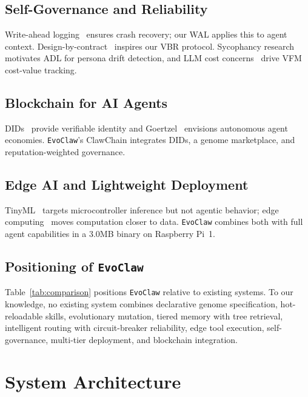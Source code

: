 \documentclass[conference]{IEEEtran}
\newcommand{\evoclaw}{\texttt{EvoClaw}\xspace}
\begin{document}
\subsection{Self-Governance and Reliability}

Write-ahead logging~\cite{hewitt1976implementation} ensures crash recovery; our WAL applies this to agent context. Design-by-contract~\cite{meyer1997object} inspires our VBR protocol. Sycophancy research~\cite{sharma2023sycophancy} motivates ADL for persona drift detection, and LLM cost concerns~\cite{marr2023cost} drive VFM cost-value tracking.

\subsection{Blockchain for AI Agents}

DIDs~\cite{spencer2015decentralized} provide verifiable identity and Goertzel~\cite{goertzel2017agi} envisions autonomous agent economies. \evoclaw{}'s ClawChain integrates DIDs, a genome marketplace, and reputation-weighted governance.

\subsection{Edge AI and Lightweight Deployment}

TinyML~\cite{tinyml} targets microcontroller inference but not agentic behavior; edge computing~\cite{shi2016edge} moves computation closer to data. \evoclaw{} combines both with full agent capabilities in a 3.0MB binary on Raspberry Pi~1.

\subsection{Positioning of \evoclaw{}}

Table~\ref{tab:comparison} positions \evoclaw{} relative to existing systems. To our knowledge, no existing system combines declarative genome specification, hot-reloadable skills, evolutionary mutation, tiered memory with tree retrieval, intelligent routing with circuit-breaker reliability, edge tool execution, self-governance, multi-tier deployment, and blockchain integration.


\section{System Architecture}
\label{sec:architecture}
\end{document}
